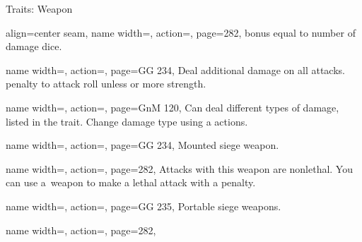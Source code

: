 \begin{PageBack}
\begin{Tables}{\backTableHeight}
\begin{Table}{Traits: Weapon}
\begin{entry}{}{%
                align=center seam,
                name width=\conditionLength,%
                action=\Jousting,
                page=282,
            }
                \Cirm bonus equal to number of damage dice.
            \end{entry}
            \breakLine
            \begin{entry}{}{%
                name width=\conditionLength,%
                action=\Kickback,
                page=GG 234,
            }
                Deal  additional damage on all attacks.  \Cirm penalty to attack roll unless
                 or more strength. \hfill {}
            \end{entry}
            \begin{entry}{}{%
                name width=\conditionLength,%
                action=\Modular,
                page=GnM 120,
            }
                Can deal different types of damage, listed in the trait. Change damage type using a  actions.
            \end{entry}
            \begin{entry}{}{%
                name width=\conditionLength,%
                action=\Mounted,
                page=GG 234,
            }
                Mounted siege weapon.
            \end{entry}
            \breakLine
            \begin{entry}{}{%
                name width=\conditionLength,%
                action=\Nonlethal,
                page=282,
            }
                Attacks with this weapon are nonlethal. You can use a \Nonlethal\,weapon to make a lethal
                attack with a  \Cirm penalty.
            \end{entry}
            \breakLine
            \begin{entry}{}{%
                name width=\conditionLength,%
                action=\Portable,
                page=GG 235,
            }
                Portable siege weapons.
            \end{entry}
            \begin{entry}{}{%
                name width=\conditionLength,%
                action=\Propulsive,
                page=282,
            }

\end{entry}
\end{Table}
\end{Tables}
\end{PageBack}
